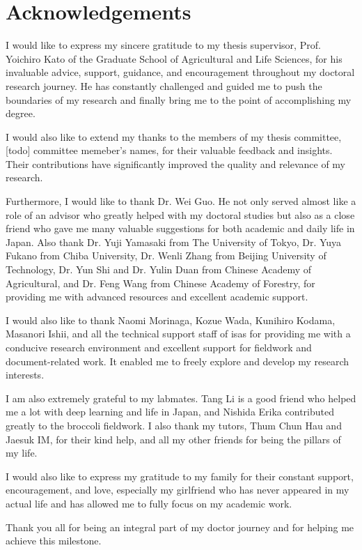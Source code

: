 \chapter*{Acknowledgements}

I would like to express my sincere gratitude to my thesis supervisor, Prof. Yoichiro Kato of the Graduate School of Agricultural and Life Sciences, for his invaluable advice, support, guidance, and encouragement throughout my doctoral research journey. He has constantly challenged and guided me to push the boundaries of my research and finally bring me to the point of accomplishing my degree.

I would also like to extend my thanks to the members of my thesis committee, [todo] committee memeber's names, for their valuable feedback and insights. Their contributions have significantly improved the quality and relevance of my research.

Furthermore, I would like to thank Dr. Wei Guo. He not only served almost like a role of an advisor who greatly helped with my doctoral studies but also as a close friend who gave me many valuable suggestions for both academic and daily life in Japan. Also thank Dr. Yuji Yamasaki from The University of Tokyo, Dr. Yuya Fukano from Chiba University, Dr. Wenli Zhang from Beijing University of Technology, Dr. Yun Shi and Dr. Yulin Duan from Chinese Academy of Agricultural, and Dr. Feng Wang from Chinese Academy of Forestry, for providing me with advanced resources and excellent academic support.

I would also like to thank Naomi Morinaga, Kozue Wada, Kunihiro Kodama, Masanori Ishii, and all the technical support staff of \gls{isas} for providing me with a conducive research environment and excellent support for fieldwork and document-related work. It enabled me to freely explore and develop my research interests.

I am also extremely grateful to my labmates. Tang Li is a good friend who helped me a lot with deep learning and life in Japan, and Nishida Erika contributed greatly to the broccoli fieldwork. I also thank my tutors, Thum Chun Hau and Jaesuk IM, for their kind help, and all my other friends for being the pillars of my life.

I would also like to express my gratitude to my family for their constant support, encouragement, and love, especially my girlfriend who has never appeared in my actual life and has allowed me to fully focus on my academic work.

Thank you all for being an integral part of my doctor journey and for helping me achieve this milestone.